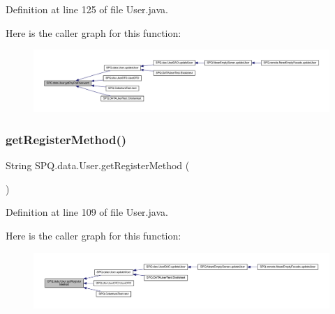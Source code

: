 Definition at line 125 of file User.\+java.

Here is the caller graph for this function\+:
\nopagebreak
\begin{figure}[H]
\begin{center}
\leavevmode
\includegraphics[width=350pt]{class_s_p_q_1_1data_1_1_user_aa3a0bdf1676addb67307fa9a66495fa4_icgraph}
\end{center}
\end{figure}
\mbox{\label{class_s_p_q_1_1data_1_1_user_a4a336e889bfdefbd439134b27e8873fc}} 
\subsubsection{\texorpdfstring{get\+Register\+Method()}{getRegisterMethod()}}
{\footnotesize\ttfamily String S\+P\+Q.\+data.\+User.\+get\+Register\+Method (\begin{DoxyParamCaption}{ }\end{DoxyParamCaption})}



Definition at line 109 of file User.\+java.

Here is the caller graph for this function\+:
\nopagebreak
\begin{figure}[H]
\begin{center}
\leavevmode
\includegraphics[width=350pt]{class_s_p_q_1_1data_1_1_user_a4a336e889bfdefbd439134b27e8873fc_icgraph}
\end{center}
\end{figure}
\mbox{\label{class_s_p_q_1_1data_1_1_user_a55d2e322edbbe446287ce25baecdd421}} 
